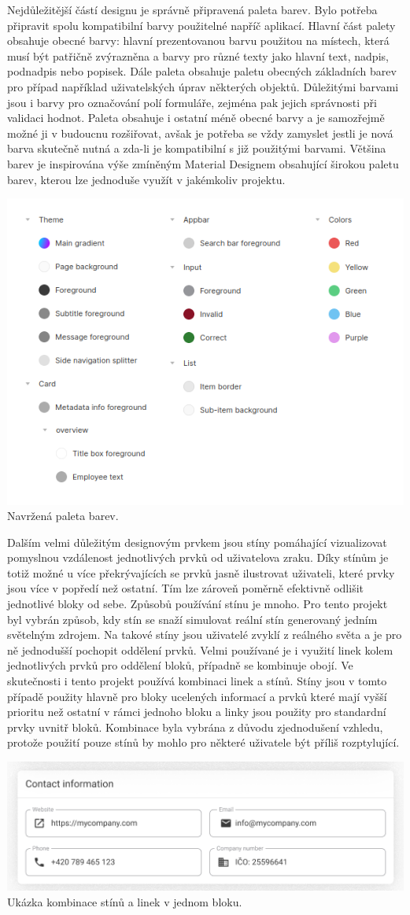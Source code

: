 		Nejdůležitější částí designu je správně připravená paleta barev.
		Bylo potřeba připravit spolu kompatibilní barvy použitelné napříč aplikací.
		Hlavní část palety obsahuje obecné barvy: hlavní prezentovanou barvu použitou na místech, která musí být
		patřičně zvýrazněna a barvy pro různé texty jako hlavní text, nadpis, podnadpis nebo popisek.
		Dále paleta obsahuje paletu obecných základních barev pro případ například uživatelských úprav některých objektů.
		Důležitými barvami jsou i barvy pro označování polí formuláře, zejména pak jejich správnosti při validaci
		hodnot.
		Paleta obsahuje i ostatní méně obecné barvy a je samozřejmě možné ji v budoucnu rozšiřovat, avšak je potřeba se
		vždy zamyslet jestli je nová barva skutečně nutná a zda-li je kompatibilní s již použitými barvami.
		Většina barev je inspirována výše zmíněným Material Designem obsahující širokou paletu barev, kterou lze jednoduše
		využít v jakémkoliv projektu.

		\includegraphics[width=0.24\linewidth]{obrazky/paleta_barev.png}\hfill
		Navržená paleta barev. %

		Dalším velmi důležitým designovým prvkem jsou stíny pomáhající vizualizovat pomyslnou vzdálenost jednotlivých
		prvků od uživatelova zraku.
		Díky stínům je totiž možné u více překrývajících se prvků jasně ilustrovat uživateli, které prvky jsou více v
		popředí než ostatní.
		Tím lze zároveň poměrně efektivně odlišit jednotlivé bloky od sebe.
		Způsobů používání stínu je mnoho.
		Pro tento projekt byl vybrán způsob, kdy stín se snaží simulovat reální stín generovaný jedním světelným zdrojem.
		Na takové stíny jsou uživatelé zvyklí z reálného světa a je pro ně jednodušší pochopit oddělení prvků.
		Velmi používané je i využití linek kolem jednotlivých prvků pro oddělení bloků, případně se kombinuje obojí.
		Ve skutečnosti i tento projekt používá kombinaci linek a stínů.
		Stíny jsou v tomto případě použity hlavně pro bloky ucelených informací a prvků které mají vyšší prioritu než
		ostatní v rámci jednoho bloku a linky jsou použity pro standardní prvky uvnitř bloků.
		Kombinace byla vybrána z důvodu zjednodušení vzhledu, protože použití pouze stínů by mohlo pro některé uživatele
		být příliš rozptylující.

		\includegraphics[width=0.24\linewidth]{obrazky/ukazka_stinu_a_linek}\hfill
		Ukázka kombinace stínů a linek v jednom bloku. %

